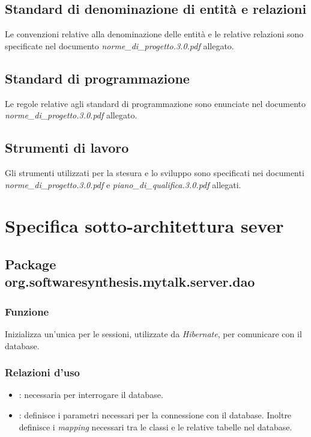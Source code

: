 \subsection{Standard di denominazione di entità e relazioni}
Le convenzioni relative alla denominazione delle entità e le relative relazioni sono specificate nel documento \textit{norme\_di\_progetto.3.0.pdf} allegato.

\subsection{Standard di programmazione}
Le regole relative agli standard di programmazione sono enunciate nel documento \textit{norme\_di\_progetto.3.0.pdf} allegato.

\subsection{Strumenti di lavoro}
Gli strumenti utilizzati per la stesura e lo sviluppo sono specificati nei documenti \textit{norme\_di\_progetto.3.0.pdf} e \textit{piano\_di\_qualifica.3.0.pdf} allegati.

\clearpage

\section{Specifica sotto-architettura sever}\label{sec:serverarchitecture}

\subsection{Package org.softwaresynthesis.mytalk.server.dao}\label{sec:dao}


\subsubsection*{Funzione}
Inizializza un'unica  per le sessioni, utilizzate da \textit{Hibernate}, per comunicare con il database.

\subsubsection*{Relazioni d'uso}

\begin{itemize}
	\item {}: necessaria per interrogare il database.
	\item {}: definisce i parametri necessari per la connessione con il database. Inoltre definisce i \textit{mapping} necessari tra le classi  e le relative tabelle nel database.
\end{itemize}


